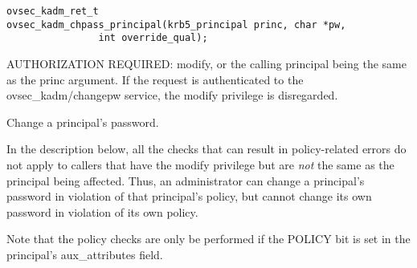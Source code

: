 \begin{verbatim}
ovsec_kadm_ret_t
ovsec_kadm_chpass_principal(krb5_principal princ, char *pw, 
                int override_qual);
\end{verbatim}

AUTHORIZATION REQUIRED: modify, or the calling principal being the
same as the princ argument.  If the request is authenticated to the
ovsec_kadm/changepw service, the modify privilege is disregarded.

Change a principal's password.  

In the description below, all the checks that can result in
policy-related errors do not apply to callers that have the modify
privilege but are {\it not} the same as the principal being affected.
Thus, an administrator can change a principal's password in violation
of that principal's policy, but cannot change its own password in
violation of its own policy.

Note that the policy checks are only be performed if the POLICY bit is
set in the principal's aux_attributes field.

